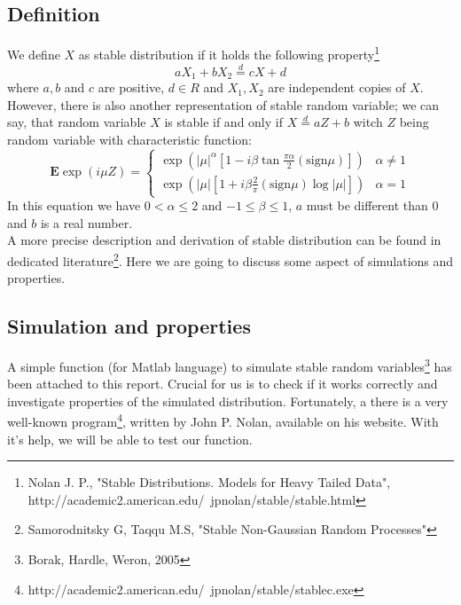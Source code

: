 \documentclass{article}
\begin{document}
	\subsection{Definition}
	We define $X$ as stable distribution if it holds the following property\footnote{Nolan J. P., "Stable Distributions. Models for Heavy Tailed Data", http://academic2.american.edu/~jpnolan/stable/stable.html}
	\begin{equation}
	aX_1+bX_2 \stackrel{d}{=} cX + d
	\end{equation}
	where $a, b$ and $c$ are positive, $d\in R$ and $X_1, X_2$ are independent copies of $X$.
	However, there is also another representation of stable random variable; we can say, that random variable $X$ is stable if and only if $X \stackrel{d}{=} aZ + b$ witch $Z$ being random variable with characteristic function:
	\begin{equation}
		\mathbf{E} \exp(i\mu Z) = \begin{cases}
		\exp(|\mu|^\alpha[1-i\beta \tan\frac{\pi \alpha}{2}(\mbox{sign}\mu)]) & \alpha \neq 1 \\
		\exp(|\mu|[1+i\beta \frac{2}{\pi} (\mbox{sign}\mu) \log |\mu|]) & \alpha = 1
		\end{cases}
	\end{equation}
In this equation we have $0<\alpha \leq 2$ and $-1 \leq \beta \leq 1$, $a$ must be different than $0$ and $b$ is a real number.\\
A more precise description and derivation of stable distribution can be found in dedicated literature\footnote{Samorodnitsky G, Taqqu M.S, "Stable Non-Gaussian Random Processes"}. Here we are going to discuss some aspect of simulations and properties.
	\subsection{Simulation and properties}
	A simple function (for Matlab language) to simulate stable random variables\footnote{Borak, Hardle, Weron, 2005} has been attached to this report. Crucial for us is to check if it works correctly and investigate properties of the simulated distribution. Fortunately, a there is a very well-known program\footnote{http://academic2.american.edu/~jpnolan/stable/stablec.exe}, written by John P. Nolan, available on his website. With it's help, we will be able to test our function.
\end{document}
